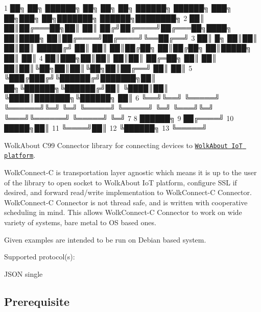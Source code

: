 
\begin{DoxyCode}
1 ██╗    ██╗ ██████╗ ██╗     ██╗  ██╗ ██████╗ ██████╗ ███╗   ██╗███╗   ██╗███████╗ ██████╗████████╗  
2 ██║    ██║██╔═══██╗██║     ██║ ██╔╝██╔════╝██╔═══██╗████╗  ██║████╗  ██║██╔════╝██╔════╝╚══██╔══╝  
3 ██║ █╗ ██║██║   ██║██║     █████╔╝ ██║     ██║   ██║██╔██╗ ██║██╔██╗ ██║█████╗  ██║        ██║     
4 ██║███╗██║██║   ██║██║     ██╔═██╗ ██║     ██║   ██║██║╚██╗██║██║╚██╗██║██╔══╝  ██║        ██║     
5 ╚███╔███╔╝╚██████╔╝███████╗██║  ██╗╚██████╗╚██████╔╝██║ ╚████║██║ ╚████║███████╗╚██████╗   ██║     
6  ╚══╝╚══╝  ╚═════╝ ╚══════╝╚═╝  ╚═╝ ╚═════╝ ╚═════╝ ╚═╝  ╚═══╝╚═╝  ╚═══╝╚══════╝ ╚═════╝   ╚═╝     
7 
8                                                                                             ██████╗
9                                                                                            ██╔════╝
10                                                                                      █████╗██║     
11                                                                                      ╚════╝██║     
12                                                                                            ╚██████╗
13                                                                                             ╚═════╝
\end{DoxyCode}


 Wolk\+About C99 Connector library for connecting devices to \href{https://demo.wolkabout.com/#/login}{\tt Wolk\+About IoT platform}.

Wolk\+Connect-\/C is transportation layer agnostic which means it is up to the user of the library to open socket to Wolk\+About IoT platform, configure S\+SL if desired, and forward read/write implementation to Wolk\+Connect-\/C Connector. Wolk\+Connect-\/C Connector is not thread safe, and is written with cooperative scheduling in mind. This allows Wolk\+Connect-\/C Connector to work on wide variety of systems, bare metal to OS based ones.

Given examples are intended to be run on Debian based system.

Supported protocol(s)\+:
\begin{DoxyItemize}
\item J\+S\+ON single
\end{DoxyItemize}

\subsection*{Prerequisite }

